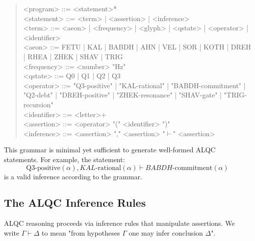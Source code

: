 \documentclass[11pt, letterpaper]{article}
\newcommand{\FETU}{\ensuremath{\mathop{\textnormal{\thaanafont\symbol{"23E3}}}}}   %
\newcommand{\KAL}{\ensuremath{\mathop{\textnormal{\symbolafont\symbol{"29C9}}}}}    %
\newcommand{\BABDH}{\ensuremath{\mathop{\textnormal{\symbolafont\symbol{"2316}}}}}   %
\newcommand{\AHN}{\ensuremath{\mathop{\textnormal{\symbolafont\symbol{"27C1}}}}}    %
\newcommand{\VEL}{\ensuremath{\mathop{\textnormal{\symbolafont\symbol{"2734}}}}}    %
\newcommand{\SOR}{\ensuremath{\mathop{\textnormal{\symbolafont\symbol{"229B}}}}}    %
\newcommand{\KOTH}{\ensuremath{\mathop{\textnormal{\symbolafont\symbol{"1F702}}}}}  %
\newcommand{\DREH}{\ensuremath{\mathop{\textnormal{\symbolafont\symbol{"29D7}}}}}   %
\newcommand{\RHEA}{\ensuremath{\mathop{\textnormal{\symbolafont\symbol{"2A54}}}}}   %
\newcommand{\ZHEK}{\ensuremath{\mathop{\textnormal{\symbolafont\symbol{"25C8}}}}}   %
\newcommand{\SHAV}{\ensuremath{\mathop{\textnormal{\symbolafont\symbol{"2742}}}}}   %
\newcommand{\TRIG}{\ensuremath{\mathop{\textnormal{\tifinaghfont\symbol{"2D63}}}}}    %
\def\FETU{FETU}%
\def\KAL{KAL}%
\def\BABDH{BABDH}%
\def\AHN{AHN}%
\def\VEL{VEL}%
\def\SOR{SOR}%
\def\KOTH{KOTH}%
\def\DREH{DREH}%
\def\RHEA{RHEA}%
\def\ZHEK{ZHEK}%
\def\SHAV{SHAV}%
\def\TRIG{TRIG}%
\begin{document}
\begin{quote}
\ttfamily
<program>    ::= <statement>* \\
<statement>  ::= <term> | <assertion> | <inference> \\
<term>       ::= <aeon> | <frequency> | <glyph> | <qstate> | <operator> | <identifier> \\
<aeon>       ::= \FETU{} | \KAL{} | \BABDH{} | \AHN{} | \VEL{} | \SOR{} | \KOTH{} | \DREH{} | \RHEA{} | \ZHEK{} | \SHAV{} | \TRIG{} \\
<frequency>  ::= <number> "Hz" \\
<qstate>     ::= Q0 | Q1 | Q2 | Q3 \\
<operator>   ::= "Q3-positive" | "\KAL-rational" | "\BABDH-commitment" | "Q2-debt" | "\DREH-positive" | "\ZHEK-resonance" | "\SHAV-gate" | "\TRIG-recursion" \\
<identifier> ::= <letter>+ \\
<assertion>  ::= <operator> "(" <identifier> ")" \\
<inference>  ::= <assertion> "," <assertion> "$\vdash$" <assertion>
\normalfont
\end{quote}

This grammar is minimal yet sufficient to generate well-formed ALQC statements. For example, the statement:
\[
\text{Q3-positive}(\alpha), \KAL\text{-rational}(\alpha) \vdash \BABDH\text{-commitment}(\alpha)
\]
is a valid inference according to the grammar.

\subsection{The ALQC Inference Rules}\label{appendixJ.7}

ALQC reasoning proceeds via inference rules that manipulate assertions. We write $\Gamma \vdash \Delta$ to mean "from hypotheses $\Gamma$ one may infer conclusion $\Delta$".
\end{document}
